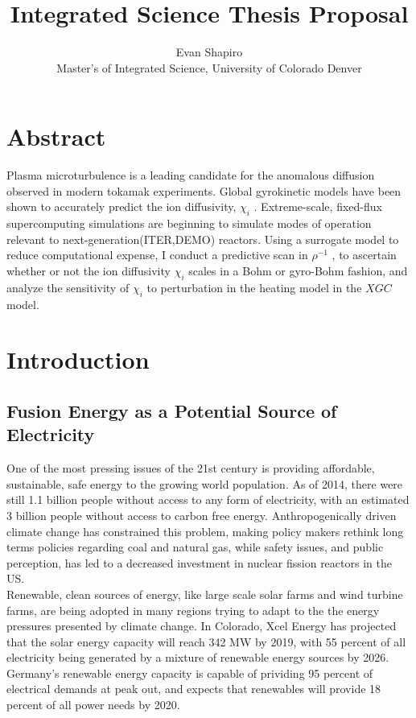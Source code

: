 \documentclass{article}
\title{Integrated Science Thesis Proposal}
\author{Evan Shapiro \\ Master's of Integrated Science, University of Colorado Denver}
\begin{document}
\maketitle
\tableofcontents
\section{Abstract}
Plasma microturbulence is a leading candidate for the anomalous
diffusion observed in modern tokamak experiments. Global gyrokinetic
models have been shown to accurately predict the ion diffusivity, $\chi_i$
. Extreme-scale, fixed-flux supercomputing simulations are beginning
to simulate modes of operation relevant to next-generation(ITER,DEMO)
reactors. Using a surrogate model to reduce computational expense, I conduct a predictive scan
in $\rho^{-1}$ , to ascertain
whether or not the ion diffusivity $\chi_i$ scales in a Bohm or gyro-Bohm
fashion, and analyze the sensitivity of $\chi_i$ to perturbation in the heating
model in the $XGC$ model.

\section{Introduction}
\subsection{Fusion Energy as a Potential Source of Electricity}
One of the most pressing issues of the 21st century is providing affordable, sustainable, safe energy to the growing world population.  As of 2014, there were still 1.1 billion people without access to any form of electricity, with an estimated 3 billion people without access to carbon free energy. Anthropogenically driven climate change has constrained this problem, making policy makers rethink long terms policies regarding coal and natural gas, while safety issues, and public perception, has led to a decreased investment in nuclear fission reactors in the US.\\
Renewable, clean sources of energy, like large scale solar farms and wind turbine farms, are being adopted in many regions trying to adapt to the the energy pressures presented by climate change. In Colorado, Xcel Energy has projected that the solar energy capacity will reach 342 MW by 2019, with 55 percent of all electricity being generated by a mixture of renewable energy sources by 2026. Germany's renewable energy capacity is capable of prividing 95 percent of electrical demands at peak out, and expects that renewables will provide 18 percent of all power needs by 2020.\\
\end{document}
